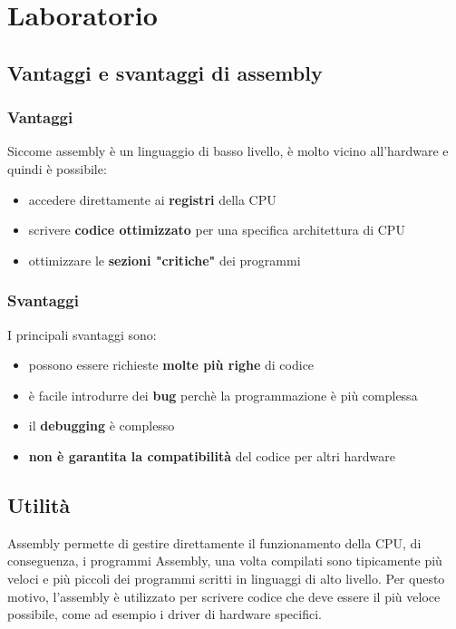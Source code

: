 \documentclass[a4paper]{article}
\theoremstyle{break}
\theoremstyle{break}
\theoremstyle{break}
\theoremstyle{break}
\begin{document}


\tableofcontents
\pagebreak

\section{Laboratorio}
\subsection{Vantaggi e svantaggi di assembly}
\subsubsection{Vantaggi}
Siccome assembly è un linguaggio di basso livello, è molto vicino all'hardware e quindi è possibile:
\begin{itemize}
	\item accedere direttamente ai \textbf{registri} della CPU
	\item scrivere \textbf{codice ottimizzato} per una specifica architettura di CPU
	\item ottimizzare le \textbf{sezioni "critiche"} dei programmi
\end{itemize}

\subsubsection{Svantaggi}
I principali svantaggi sono:
\begin{itemize}
	\item possono essere richieste \textbf{molte più righe} di codice
	\item è facile introdurre dei \textbf{bug} perchè la programmazione è più complessa
	\item il \textbf{debugging} è complesso
	\item \textbf{non è garantita la compatibilità} del codice per altri hardware
\end{itemize}

\subsection{Utilità}
Assembly permette di gestire direttamente il funzionamento della CPU, di conseguenza,
i programmi Assembly, una volta compilati sono tipicamente più veloci e più piccoli dei
programmi scritti in linguaggi di alto livello. Per questo motivo, l'assembly è utilizzato
per scrivere codice che deve essere il più veloce possibile, come ad esempio i driver di
hardware specifici.
\end{document}
